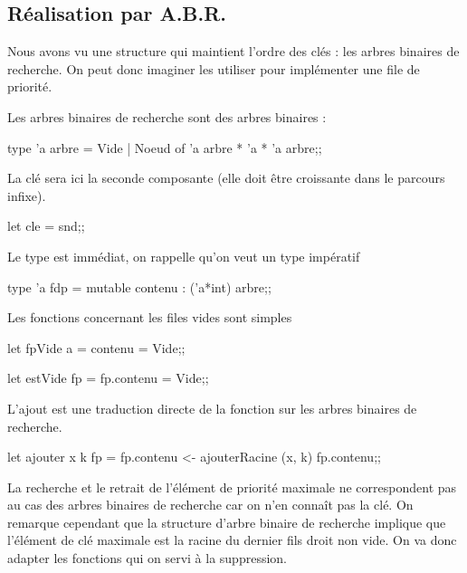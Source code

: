 \subsection{Réalisation par A.B.R.}
Nous avons vu une structure qui maintient l'ordre des clés : les arbres binaires de recherche. On peut donc imaginer les utiliser pour implémenter une file de priorité.

Les arbres binaires de recherche sont des arbres binaires :
\begin{ocaml}
type 'a arbre = Vide | Noeud of 'a arbre * 'a * 'a arbre;;
\end{ocaml}
La clé sera ici la seconde composante (elle doit être croissante dans le parcours infixe).
\begin{ocaml}
let cle = snd;;
\end{ocaml}
Le type est immédiat, on rappelle qu'on veut un type impératif
\begin{ocaml}
type 'a fdp = 
   {mutable contenu : ('a*int) arbre};;
\end{ocaml}
Les fonctions concernant les files vides sont simples
\begin{ocaml}
let fpVide a = 
   {contenu = Vide};;

let estVide fp = 
   fp.contenu = Vide;;
\end{ocaml}
L'ajout est une traduction directe de la fonction sur les arbres binaires de recherche.
\begin{ocaml}
let ajouter x k fp  = 
  fp.contenu <- ajouterRacine (x, k) fp.contenu;;
\end{ocaml}
La recherche et le retrait de l'élément de priorité maximale ne correspondent pas au cas des arbres binaires de recherche car on n'en connaît pas la clé. On remarque cependant que la structure d'arbre binaire de recherche implique que l'élément de clé maximale est la racine du dernier fils droit non vide. On va donc adapter les fonctions qui on servi à la suppression.
